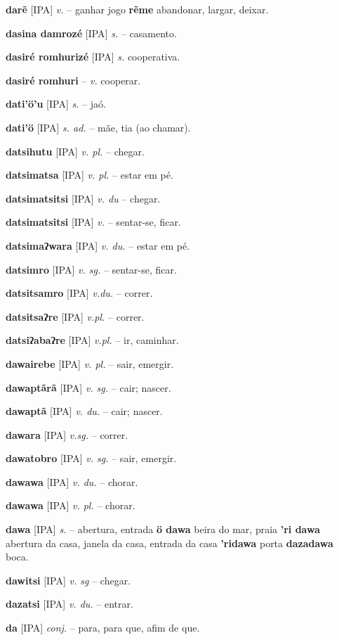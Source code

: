 \textbf{darẽ} [IPA] \textit{v.} -- ganhar jogo  \textbf{rẽme} abandonar, largar, deixar.

\textbf{dasina damrozé} [IPA] \textit{s.} -- casamento.

\textbf{dasiré romhurizé} [IPA] \textit{s.} cooperativa.

\textbf{dasiré romhuri} -- \textit{v.} cooperar.

\textbf{dati'ö'u} [IPA] \textit{s.} -- jaó.

\textbf{dati'ö} [IPA] \textit{s. ad.} -- mãe, tia (ao chamar).

\textbf{datsihutu} [IPA] \textit{v. pl.} -- chegar.

\textbf{datsimatsa} [IPA] \textit{v. pl.} -- estar em pé.

\textbf{datsimatsitsi} [IPA] \textit{v. du} -- chegar.

\textbf{datsimatsitsi} [IPA] \textit{v.} -- sentar-se, ficar.

\textbf{datsimaʔwara} [IPA] \textit{v. du.} -- estar em pé.

\textbf{datsimro} [IPA] \textit{v. sg.} -- sentar-se, ficar.

\textbf{datsitsamro} [IPA] \textit{v.du.} -- correr.

\textbf{datsitsaʔre} [IPA] \textit{v.pl.} -- correr.

\textbf{datsiʔabaʔre} [IPA] \textit{v.pl.} -- ir, caminhar.

\textbf{dawairebe} [IPA] \textit{v. pl.} -- sair, emergir.

\textbf{dawaptãrã} [IPA] \textit{v. sg.} -- cair; nascer.

\textbf{dawaptã} [IPA] \textit{v. du.} -- cair; nascer.

\textbf{dawara} [IPA] \textit{v.sg.} -- correr.

\textbf{dawatobro} [IPA] \textit{v. sg.} -- sair, emergir.

\textbf{dawawa} [IPA] \textit{v. du.} -- chorar.

\textbf{dawawa} [IPA] \textit{v. pl.} -- chorar.

\textbf{dawa} [IPA] \textit{s.} -- abertura, entrada  \textbf{ö dawa} beira do mar, praia  \textbf{'ri dawa} abertura da casa, janela da casa, entrada da casa  \textbf{'ridawa} porta  \textbf{dazadawa} boca.

\textbf{dawitsi} [IPA] \textit{v. sg} -- chegar.

\textbf{dazatsi} [IPA] \textit{v. du.} -- entrar.

\textbf{da} [IPA] \textit{conj.} -- para, para que, afim de que.

